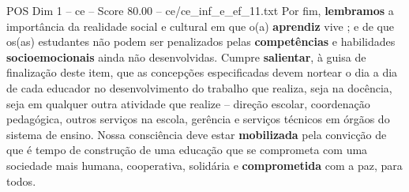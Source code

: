 \begin{textsample}{POS Dim 1 – ce – Score 80.00 – ce/ce\_inf\_e\_ef\_11.txt}
Por fim, \textbf{lembramos} a importância da realidade social e cultural em que o(a) \textbf{aprendiz} vive ; e de que os(as) estudantes não podem ser penalizados pelas \textbf{competências} e habilidades \textbf{socioemocionais} ainda não desenvolvidas.
Cumpre \textbf{salientar}, à guisa de finalização deste item, que as concepções especificadas devem nortear o dia a dia de cada educador no desenvolvimento do trabalho que realiza, seja na docência, seja em qualquer outra atividade que realize – direção escolar, coordenação pedagógica, outros serviços na escola, gerência e serviços técnicos em órgãos do sistema de ensino.
Nossa consciência deve estar \textbf{mobilizada} pela convicção de que é tempo de construção de uma educação que se comprometa com uma sociedade mais humana, cooperativa, solidária e \textbf{comprometida} com a paz, para todos.

\end{textsample}
